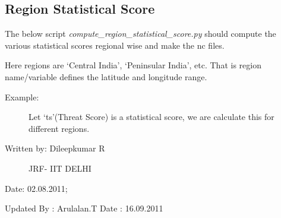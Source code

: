 \documentclass[letterpaper,10pt,english]{sphinxmanual}
\begin{document}
\subsection{Region Statistical Score}
\label{diagnosis:region-statistical-score}
The below script \emph{compute\_region\_statistical\_score.py} should compute the various statistical scores regional wise and make the nc files.

Here regions are `Central India', `Peninsular India', etc. That is region name/variable defines the latitude and longitude range.
\label{diagnosis:module-compute_region_statistical_score}\label{diagnosis:module-compute_region_statistical_score.py}\begin{description}
\item[{Example:}] \leavevmode
Let `ts'(Threat Score) is a statistical score,
we are calculate this for different regions.

\item[{Written by: Dileepkumar R}] \leavevmode
JRF- IIT DELHI

\end{description}

Date: 02.08.2011;

Updated By : Arulalan.T
Date : 16.09.2011
\end{document}
